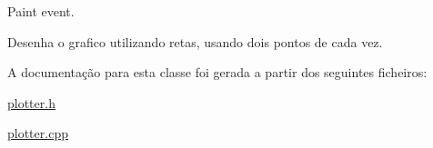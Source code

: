 Paint event. 

Desenha o grafico utilizando retas, usando dois pontos de cada vez. 

A documentação para esta classe foi gerada a partir dos seguintes ficheiros\+:\begin{DoxyCompactItemize}
\item 
\hyperlink{plotter_8h}{plotter.\+h}\item 
\hyperlink{plotter_8cpp}{plotter.\+cpp}\end{DoxyCompactItemize}
